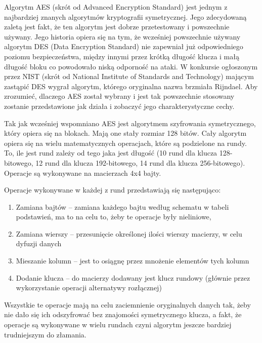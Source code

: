 Algorytm AES (skrót od Advanced Encryption Standard) jest jednym z najbardziej znanych algorytmów kryptografii symetrycznej. Jego zdecydowaną zaletą jest fakt, że ten algorytm jest dobrze przetestowany i powszechnie używany. Jego historia opiera się na tym, że wcześniej powszechnie używany algorytm DES (Data Encryption Standard) nie zapewniał już odpowiedniego poziomu bezpieczeństwa, między innymi przez krótką długość klucza i małą długość bloku co powodowało niską odporność na ataki. W konkursie ogłoszonym przez NIST (skrót od National Institute of Standards and Technology) mającym zastąpić DES wygrał algorytm, którego oryginalna nazwa brzmiała Rijndael. Aby zrozumieć, dlaczego AES został wybrany i jest tak powszechnie stosowany zostanie przedstawione jak działa i zobaczyć jego charakterystyczne cechy.

\vspace{0.3\baselineskip}

Tak jak wcześniej wspomniano AES jest algorytmem szyfrowania symetrycznego, który opiera się na blokach. Mają one stały rozmiar 128 bitów. Cały algorytm opiera się na wielu matematycznych operacjach, które są podzielone na rundy. To, ile jest rund zależy od tego jaka jest długość (10 rund dla klucza 128-bitowego, 12 rund dla klucza 192-bitowego, 14 rund dla klucza 256-bitowego). Operacje są wykonywane na macierzach 4x4 bajty.

\vspace{0.3\baselineskip}

Operacje wykonywane w każdej z rund przedstawiają się następująco:
\begin{enumerate}
    \item Zamiana bajtów – zamiana każdego bajtu według schematu w tabeli podstawień, ma to na celu to, żeby te operacje były nieliniowe,
    \item Zamiana wierszy – przesunięcie określonej ilości wierszy macierzy, w celu dyfuzji danych
    \item Mieszanie kolumn – jest to osiągnę przez mnożenie elementów tych kolumn
    \item Dodanie klucza – do macierzy dodawany jest klucz rundowy (głównie przez wykorzystanie operacji alternatywy rozłącznej)
\end{enumerate}
Wszystkie te operacje mają na celu zaciemnienie oryginalnych danych tak, żeby nie dało się ich odszyfrować bez znajomości symetrycznego klucza, a fakt, że operacje są wykonywane w wielu rundach czyni algorytm jeszcze bardziej trudniejszym do złamania.

